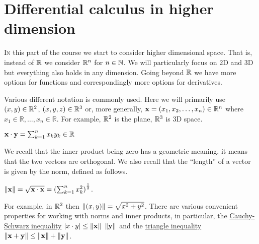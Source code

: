 \chapter{Differential calculus in higher dimension}
\bookletstart

\lettrine{I}{n} this part of the course we start to consider higher dimensional space.
That is, instead of \(\mathbb{R}\) we consider \(\mathbb{R}^n\) for \(n\in \mathbb{N}\).
We will particularly focus on 2D and 3D but everything also holds in any dimension.
Going beyond \(\mathbb{R}\) we have more options for functions and correspondingly more options for derivatives.

Various different notation is commonly used.
Here we will primarily use \((x,y)\in \mathbb{R}^2\), \((x,y,z)\in\mathbb{R}^3\) or, more generally,  \(\mathbf{x} =(x_1,x_2,\ldots,x_n) \in \mathbb{R}^n \)
where
\( x_1 \in \mathbb{R},\ldots, x_n \in \mathbb{R}\).
For example, \(\mathbb{R}^2\) is the plane, \(\mathbb{R}^3\) is 3D space.

\begin{definition}
    \(\mathbf{x} \cdot \mathbf{y} = \sum_{k=1}^{n} x_k y_k \in \mathbb{R}\)
\end{definition}

\noindent
We recall that the inner product being zero has a geometric meaning, it means that the two vectors are orthogonal.
We also recall that the ``length'' of a vector is given by the norm, defined as follows.

\begin{definition}[norm]
    \(\left\|\mathbf{x}\right\| =  \sqrt{\mathbf{x} \cdot \mathbf{x}} = {(\sum_{k=1}^{n} x_k^2 )}^{\frac{1}{2}}\).
\end{definition}

\noindent
For example, in \(\mathbb{R}^2\) then \(\left\|(x,y)\right\| = \sqrt{x^2 + y^2}\).
There are various convenient properties for working with norms and inner products, in particular, the \href{https://en.wikipedia.org/wiki/Cauchy%E2%80%93Schwarz_inequality}{Cauchy-Schwarz inequality} \(\left|x\cdot y\right| \leq \left\|\mathbf{x}\right\| \ \left\|\mathbf{y}\right\|\) and the \href{https://en.wikipedia.org/wiki/Triangle_inequality}{triangle inequality} \(\left\|\mathbf{x} + \mathbf{y}\right\| \leq \left\|\mathbf{x}\right\| + \left\|\mathbf{y}\right\|\).


